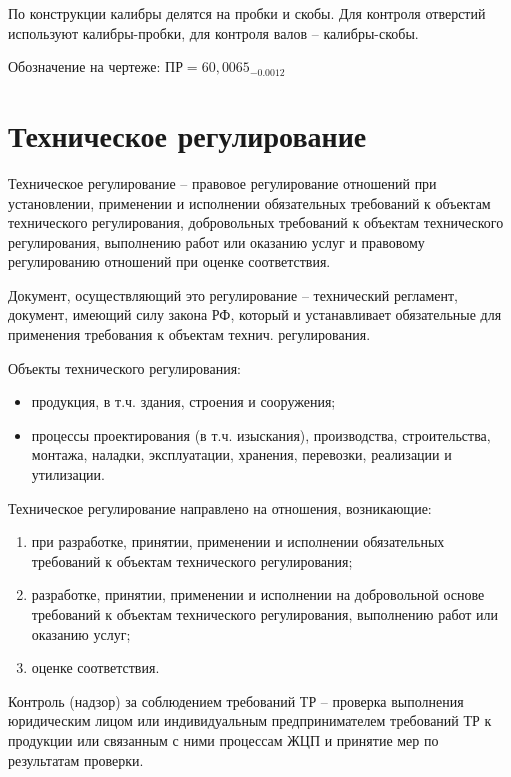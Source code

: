 По конструкции калибры делятся на пробки и скобы. Для контроля отверстий используют калибры-пробки, для контроля валов – калибры-скобы.

Обозначение на чертеже: $ ПР=60,0065_{-0.0012} $

\section{Техническое регулирование}

 Техническое регулирование – правовое регулирование отношений при установлении, применении и исполнении обязательных требований к объектам технического регулирования, добровольных требований к объектам технического регулирования, выполнению работ или оказанию услуг и правовому регулированию отношений при оценке соответствия.

Документ, осуществляющий это регулирование – технический регламент, документ, имеющий силу закона РФ, который и устанавливает обязательные для применения требования к объектам технич. регулирования.

Объекты технического регулирования:
\begin{itemize}
	\item продукция, в т.ч. здания, строения и сооружения;
	
	\item процессы проектирования (в т.ч. изыскания), производства, строительства, монтажа, наладки, эксплуатации, хранения, перевозки, реализации и утилизации.
\end{itemize}

 Техническое регулирование направлено на отношения, возникающие:

\begin{enumerate}
	\item  при разработке, принятии, применении и исполнении обязательных требований к объектам технического регулирования;
	
	\item  разработке, принятии, применении и исполнении на добровольной основе требований к объектам технического регулирования, выполнению работ или оказанию услуг;
	
	\item  оценке соответствия.
\end{enumerate}

Контроль (надзор) за соблюдением требований ТР – проверка выполнения юридическим лицом или индивидуальным предпринимателем требований ТР к продукции или связанным с ними процессам ЖЦП и принятие мер по результатам проверки.

